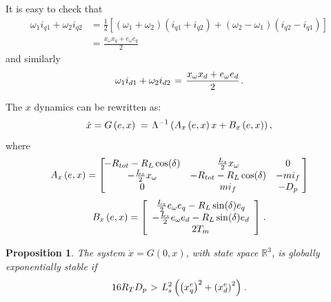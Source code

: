 \documentclass[letterpaper,10pt,conference]{ieeeconf}
\newtheorem{proposition}[theorem]{Proposition}
\newcommand{\rline}  {{\mathbb R}}
\renewcommand{\o}    {{\omega}}
\newcommand{\half}   {{\frac{1}{2}}}
\newcommand{\m}      {{\hbox{\hskip 1pt}}}
\newcommand{\nm}     {{\hbox{\hskip -3pt}}}
\begin{document}
It is easy to check that
$$ \begin{aligned} \o_1 i_{q1}+\o_2 i_{q2} &= \half\left[(\o_1+\o_2)
   (i_{q1}+i_{q2})+(\o_2-\o_1)(i_{q2}-i_{q1})\right]\\ & =\frac{x_\o
   x_q + e_\o e_q}{2} \end{aligned}$$
and similarly \vspace{-3mm}
$$ \o_1 i_{d1}+\o_2 i_{d2} \m=\m \frac{x_\o x_d+e_\o e_d}{2} \m.$$

The $x$ dynamics can be rewritten as:
$$ \dot{x}=G \left( e,x\right) \m=\m \Lambda^{-1}\left(A_x \left(e,x 
   \right) x + B_x \left( e,x\right) \right),$$
where
$$ A_x \left(e,x \right) = \left[\nm\nm\begin{array}{ccc}
   -R_{tot}-R_L\cos(\delta) & \frac{L_s}{2} x_\o & 0\\
   -\frac{L_s}{2} x_\o & -R_{tot}-R_L\cos(\delta) & -mi_f\\
   0 & mi_f & -D_p\end{array} \nm\right]$$
$$ B_x \left(e,x \right)=\left[\begin{array}{c}
   \frac{L_{s}}{2}e_{\omega}e_{q}-R_{L}\sin(\delta)e_{q}\\
   -\frac{L_{s}}{2}e_{\omega}e_{d}-R_{L}\sin(\delta)e_{d}\\
   2T_{m} \end{array}\right] \m.$$

\begin{proposition} \label{megyek_Sde_Bokerbe}
The system $\dot x=G(0,x)$, with state space $\rline^3$, is 
globally exponentially stable if 
\begin{equation} \label{eq:condition_for_stable_G}
   16 R_T D_p \m>\m L_s^2 \left( \left(x_q^e\right)^2+\left( x_d^e
   \right)^2\right) \m.
\end{equation}
\end{proposition}
\end{document}
